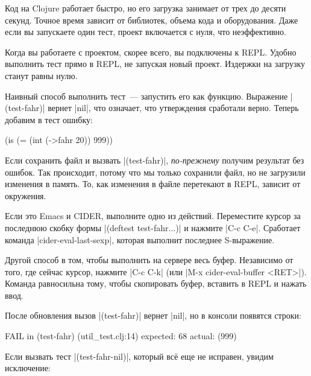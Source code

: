 Код на Clojure работает быстро, но его загрузка занимает от трех до десяти
секунд. Точное время зависит от библиотек, объема кода и оборудования. Даже если
вы запускаете один тест, проект включается с нуля, что неэффективно.

Когда вы работаете с проектом, скорее всего, вы подключены к REPL. Удобно
выполнить тест прямо в REPL, не запуская новый проект. Издержки на загрузку
станут равны нулю.

Наивный способ выполнить тест~--- запустить его как функцию. Выражение
\spverb|(test-fahr)| вернет \spverb|nil|, что означает, что утверждения
сработали верно. Теперь добавим в тест ошибку:

\begin{english}
  \begin{clojure}
(is (= (int (->fahr 20)) 999))
  \end{clojure}
\end{english}

Если сохранить файл и вызвать \spverb|(test-fahr)|, \emph{по-прежнему} получим
результат без ошибок. Так происходит, потому что мы только сохранили файл, но не
загрузили изменения в память. То, как изменения в файле перетекают в REPL,
зависит от окружения.

Если это Emacs и CIDER, выполните одно из действий. Переместите курсор за
последнюю скобку формы \spverb|(deftest test-fahr...)| и нажмите \spverb|C-c C-e|.
Сработает команда \spverb|cider-eval-last-sexp|, которая выполнит последнее S-выражение.

Другой способ в том, чтобы выполнить на сервере весь буфер. Независимо от того,
где сейчас курсор, нажмите \spverb|C-c C-k| (или \spverb|M-x cider-eval-buffer <RET>|).
Команда равносильна тому, чтобы скопировать буфер, вставить в REPL и нажать ввод.

После обновления вызов \spverb|(test-fahr)| вернет \spverb|nil|, но в консоли
появятся строки:

\begin{english}
  \begin{clojure}
FAIL in (test-fahr) (util_test.clj:14)
expected: 68
  actual: (999)
  \end{clojure}
\end{english}

Если вызвать тест \spverb|(test-fahr-nil)|, который вс\"{е} еще не исправен,
увидим исключение:

\begin{english}
\end{english}

